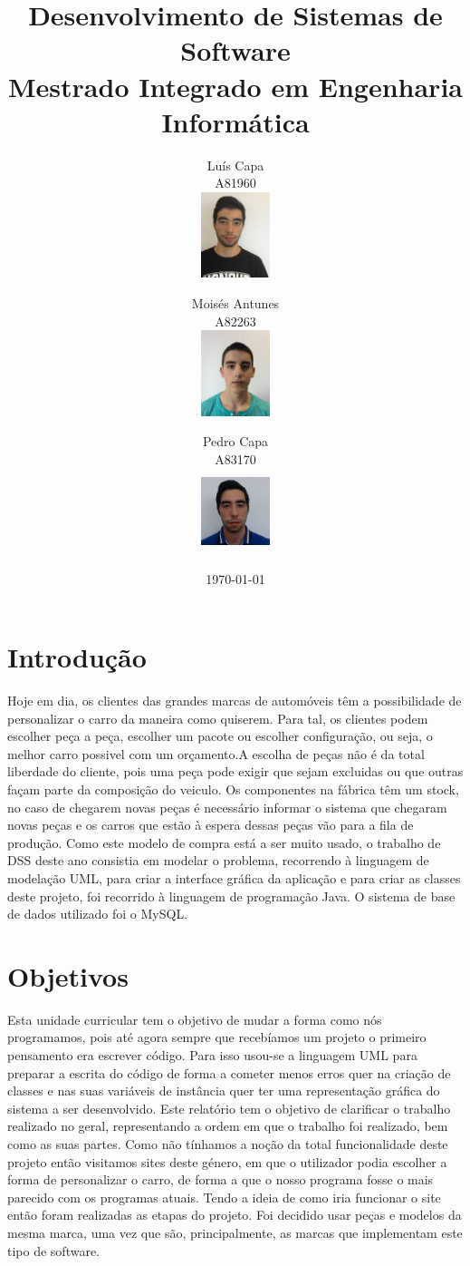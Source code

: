 \documentclass[10pt, a4paper]{report}
\title{Desenvolvimento de Sistemas de Software \\ \large{Mestrado Integrado em Engenharia Informática}}
\author{Luís Capa \\ A81960 \\ \includegraphics[width = 20mm]{luis}
	\and 
	Moisés Antunes \\ A82263 \\ \includegraphics[width = 20mm]{moises}
	\and
	Pedro Capa \\ A83170 \\ \includegraphics[width = 20mm, height = 25mm]{pedro}
}
\date{\today}
\begin{document}
\maketitle
\tableofcontents

\newpage
\chapter{Introdução}\label{Intro}
Hoje em dia, os clientes das grandes marcas de automóveis têm a possibilidade de personalizar o carro da maneira como quiserem. Para tal, os clientes podem escolher peça a peça, escolher um pacote ou escolher configuração, ou seja, o melhor carro possivel com um orçamento.A escolha de peças não é da total liberdade do cliente, pois uma peça pode exigir que sejam excluidas ou que outras façam parte da composição do veiculo. Os componentes na fábrica têm um stock, no caso de chegarem novas peças é necessário informar o sistema que chegaram novas peças e os carros que estão à espera dessas peças vão para a fila de produção.
Como este modelo de compra está a ser muito usado, o trabalho de DSS deste ano consistia em modelar o problema, recorrendo à linguagem de modelação UML, para criar a interface gráfica da aplicação e para criar as classes deste projeto, foi recorrido à linguagem de programação Java. O sistema de base de dados utilizado foi o MySQL.


\chapter{Objetivos}\label{objetivos}
Esta unidade curricular tem o objetivo de mudar a forma como nós programamos,
pois até agora sempre que recebíamos um projeto o primeiro pensamento
era escrever código. Para isso usou-se a linguagem UML para preparar a escrita
do código de forma a cometer menos erros quer na criação de classes e nas suas
variáveis de instância quer ter uma representação gráfica do sistema a ser desenvolvido.
Este relatório tem o objetivo de clarificar o trabalho realizado no geral, representando a ordem em que o trabalho foi realizado, bem como as suas partes.
Como não tínhamos a noção da total funcionalidade deste projeto então visitamos sites deste género, 
em que o utilizador podia escolher a forma de personalizar o carro, de forma a que o nosso programa fosse o mais parecido com os programas atuais. 
Tendo a ideia de como iria funcionar o site então foram realizadas as etapas do projeto.
Foi decidido usar peças e modelos da mesma marca, uma vez que são, principalmente, as marcas que implementam este tipo de software.
\end{document}
